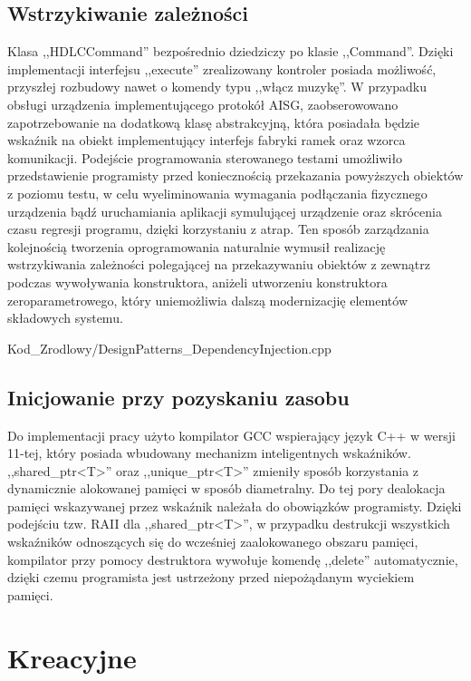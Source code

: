     \subsection{Wstrzykiwanie zależności}
        Klasa ,,HDLCCommand'' bezpośrednio dziedziczy po klasie ,,Command''. Dzięki implementacji interfejsu ,,execute'' zrealizowany kontroler posiada możliwość,
        przyszłej rozbudowy nawet o komendy typu ,,włącz muzykę''. W przypadku obsługi urządzenia implementującego protokół AISG, zaobserowowano zapotrzebowanie
        na dodatkową klasę abstrakcyjną, która posiadała będzie wskaźnik na obiekt implementujący interfejs fabryki ramek oraz wzorca komunikacji.
        Podejście programowania sterowanego testami umożliwiło przedstawienie programisty przed koniecznością przekazania powyższych obiektów z poziomu testu, w celu wyeliminowania
        wymagania podłączania fizycznego urządzenia bądź uruchamiania aplikacji symulującej urządzenie oraz skrócenia czasu regresji programu, dzięki
        korzystaniu z atrap.
        Ten sposób zarządzania kolejnością tworzenia oprogramowania naturalnie wymusił realizację wstrzykiwania zależności polegającej na
        przekazywaniu obiektów z zewnątrz podczas wywoływania konstruktora, aniżeli utworzeniu konstruktora zeroparametrowego, 
        który uniemożliwia dalszą modernizacjię elementów składowych systemu.
        
        {Kod_Zrodlowy/DesignPatterns_DependencyInjection.cpp}
    \subsection{Inicjowanie przy pozyskaniu zasobu}
        Do implementacji pracy użyto kompilator GCC wspierający język C++ w wersji 11-tej, który posiada wbudowany mechanizm inteligentnych wskaźników. ,,shared\_ptr<T>'' oraz ,,unique\_ptr<T>''
        zmieniły sposób korzystania z dynamicznie alokowanej pamięci w sposób diametralny. Do tej pory dealokacja pamięci wskazywanej przez wskaźnik należała do obowiązków programisty.
        Dzięki podejściu tzw. RAII dla ,,shared\_ptr<T>'', w przypadku destrukcji wszystkich wskaźników odnoszących się do wcześniej zaalokowanego obszaru pamięci,
        kompilator przy pomocy destruktora wywołuje komendę ,,delete'' automatycznie, dzięki czemu programista jest ustrzeżony przed niepożądanym wyciekiem pamięci.

\section{Kreacyjne}
